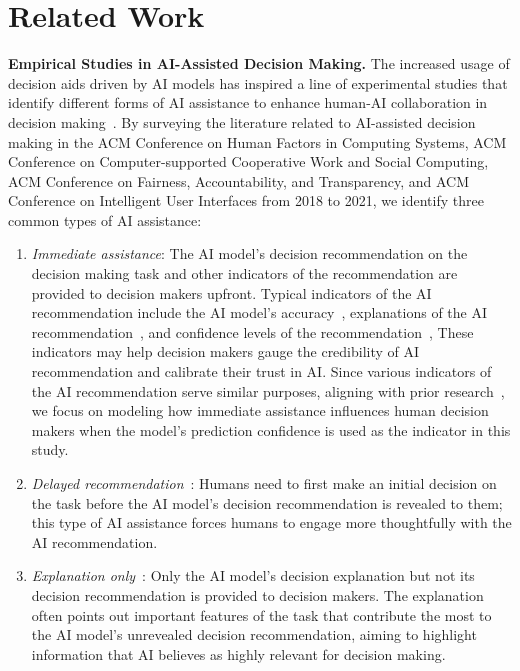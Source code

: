 \documentclass[letterpaper]{article} %
\begin{document}
\section{Related Work}
\noindent\textbf{Empirical Studies in AI-Assisted 
Decision Making.} The increased usage of decision aids driven by AI models has inspired a line of experimental studies that identify different forms of AI assistance to enhance human-AI collaboration in decision making~\cite{Lai2023TowardsAS}.  By surveying the literature related to AI-assisted decision making in the ACM Conference on Human Factors in Computing Systems, ACM Conference on Computer-supported Cooperative Work and
Social Computing, ACM Conference on Fairness, Accountability, and Transparency, and ACM Conference on Intelligent User Interfaces from 2018 to 2021, we identify three common types of AI assistance:
\begin{enumerate}
    \item \emph{Immediate assistance}: The AI model's decision recommendation on the decision making task and other indicators of the recommendation are provided to decision makers upfront. Typical indicators of the AI recommendation include the AI model's accuracy~\cite{Lai2020WhyI}, explanations of the AI recommendation~\cite{PoursabziSangdeh2018ManipulatingAM,Cheng2019ExplainingDA,SmithRenner2020NoEW,Liu2021UnderstandingTE,Tsai2021ExploringAP, Bansal2020DoesTW,Zhang2020EffectOC}, and confidence levels of the recommendation~\cite{Green2019ThePA, Guo2019VisualizingUA,Zhang2020EffectOC,Levy2021AssessingTI},  These indicators may help decision makers gauge the credibility of AI recommendation and calibrate their trust in AI. Since various indicators of the AI recommendation serve similar purposes, aligning with prior research~\cite{tejeda2022ai,wang2022will}, 
    we focus on modeling how immediate assistance influences human decision makers when the model's prediction confidence is used as the indicator in this study.

    \item \emph{Delayed recommendation}~\cite{Park2019ASA,GrgicHlaca2019HumanDM,Lu2021HumanRO,Buccinca2021ToTO,Fogliato2022WhoGF,Ma2023WhoSI}: Humans need to first make an initial decision on the task before the AI model's decision recommendation is revealed to them; this type of AI assistance forces humans to  engage more thoughtfully with the AI recommendation.

    \item \emph{Explanation only}~\cite{Lucic2019WhyDM, Alqaraawi2020EvaluatingSM,Rader2018ExplanationsAM,Schuff2022HumanIO,Berkel2021EffectOI}: Only the AI model's decision explanation but not its decision recommendation is provided to decision makers. The explanation often points out important features of the task that contribute the most to the AI model's unrevealed decision recommendation, aiming to highlight information that AI believes as highly relevant for decision making. 
  
\end{enumerate}
\end{document}
